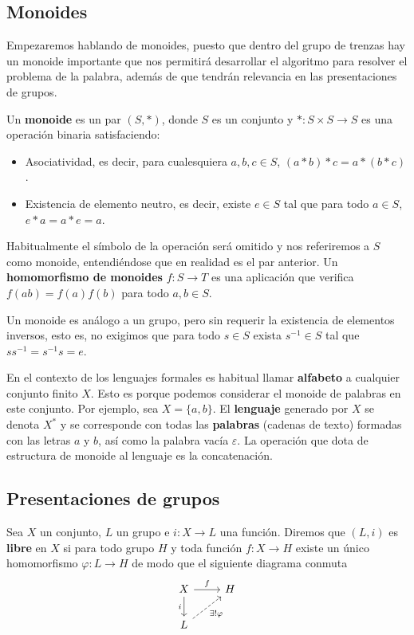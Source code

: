 \documentclass[bibtex, anon]{TEMat-article}
\begin{document}
\subsection{Monoides}

Empezaremos hablando de monoides, puesto que dentro del grupo de trenzas hay un monoide importante que nos permitirá desarrollar el algoritmo para resolver el problema de la palabra, además de que tendrán relevancia en las presentaciones de grupos.



\begin{definicion}
	Un \textbf{monoide} es un par $(S,*)$, donde $S$ es un conjunto y $*:S\times S\to S$ es una operación binaria satisfaciendo:
	\begin{itemize}
		\item Asociatividad, es decir, para cualesquiera $a,b,c\in S$, $(a*b)*c=a*(b*c)$.
		\item Existencia de elemento neutro, es decir, existe $e\in S$ tal que para todo $a\in S$, $e*a=a*e=a$. 
	\end{itemize}
	Habitualmente el símbolo de la operación será omitido y nos referiremos a $S$ como monoide, entendiéndose que en realidad es el par anterior. Un \textbf{homomorfismo de monoides} $f:S\to T$ es una aplicación que verifica $f(ab)=f(a)f(b)$ para todo $a,b\in S$. 
\end{definicion}

\begin{observacion}
	Un monoide es análogo a un grupo, pero sin requerir la existencia de elementos inversos, esto es, no exigimos que para todo $s\in S$ exista $s^{-1}\in S$ tal que $ss^{-1}=s^{-1}s=e$.
\end{observacion}

\begin{ejemplo}
	En el contexto de los lenguajes formales es habitual llamar \textbf{alfabeto} a cualquier conjunto finito $X$. Esto es porque podemos considerar el monoide de palabras en este conjunto. Por ejemplo, sea $X=\{a,b\}$. El \textbf{lenguaje} generado por $X$ se denota $X^*$ y se corresponde con todas las \textbf{palabras} (cadenas de texto) formadas con las letras $a$ y $b$, así como la palabra vacía $\varepsilon$. La operación que dota de estructura de monoide al lenguaje es la concatenación. 
	\end{ejemplo}


\subsection{Presentaciones de grupos}
\begin{definicion}
	Sea $X$ un conjunto, $L$ un grupo e $i:X\to L$ una función. Diremos que $(L,i)$ es \textbf{libre} en $X$ si para todo grupo $H$ y toda función $f:X\to H$ existe un único homomorfismo $\varphi:L\to H$ de modo que el siguiente diagrama conmuta
	\[
	\begin{tikzcd}
	X\arrow[r, "f"]\arrow[d,"i"'] & H\\
	L\arrow[ur, dashed, "\exists!\varphi"']
	\end{tikzcd}
	\]
\end{definicion}
\end{document}

